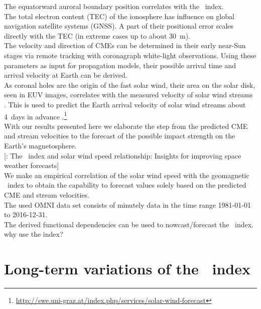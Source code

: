 The equatorward auroral boundary position correlates with the \Kp~index.\\

The total electron content (TEC) of the ionosphere has influence on global navigation satellite systems (GNSS). A part of their positional error scales directly with the TEC (in extreme cases up to about \SI{30}{\m}).\\

The velocity and direction of CMEs can be determined in their early near-Sun stages via remote tracking with coronagraph white-light observations. Using these parameters as input for propagation models, their possible arrival time and arrival velocity at Earth can be derived.\\

As coronal holes are the origin of the fast solar wind, their area on the solar disk, seen in EUV images, correlates with the measured velocity of solar wind streams \citep{Vrsnak2007}. This is used to predict the Earth arrival velocity of solar wind streams about 4~days in advance \citep{Rotter2012}.\footnote{\url{http://swe.uni-graz.at/index.php/services/solar-wind-forecast}}\\

With our results presented here we elaborate the step from the predicted CME and stream velocities to the forecast of the possible impact strength on the Earth's magnetosphere.\\

[\citet{Elliott2013}: The \Kp~index and solar wind speed relationship: Insights for improving space weather forecasts]\\

We make an empirical correlation of the solar wind speed with the geomagnetic \Kp~index to obtain the capability to forecast \Kp{} values solely based on the predicted CME and stream velocities.\\

The used OMNI data set consists of minutely data in the time range 1981-01-01 to 2016-12-31.\\

The derived functional dependencies can be used to nowcast/forecast the \Kp~index.\\


why use the \Kp{} index?\\


\section{Long-term variations of the \Kp{}~index}

